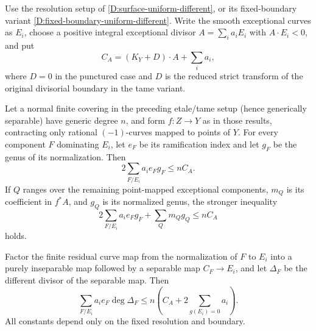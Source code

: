 \begin{corollary}
\label{D:surface-residual-genus-bound}
Use the resolution setup of
\ref{D:surface-uniform-different}, or its fixed-boundary variant
\ref{D:fixed-boundary-uniform-different}. Write the smooth exceptional
curves as $E_i$, choose a positive integral exceptional divisor
$A=\sum_i a_iE_i$ with $A\cdot E_i<0$, and put
\[
 C_A=(K_Y+D)\cdot A+\sum_i a_i,
\]
where $D=0$ in the punctured case and $D$ is the reduced strict
transform of the original divisorial boundary in the tame variant.

Let a normal finite covering in the preceding etale/tame setup
(hence generically separable) have generic degree $n$, and form
$f:Z\to Y$ as in those results, contracting only rational
$(-1)$-curves mapped to points of $Y$. For every component $F$
dominating $E_i$, let $e_F$ be its ramification index and let
$g_F$ be the genus of its normalization. Then
\[
 2\sum_{F/E_i}a_i e_Fg_F\leq n C_A.
 \tag{15}
\]
If $Q$ ranges over the remaining point-mapped exceptional components,
$m_Q$ is its coefficient in $f^*A$, and $g_Q$ is its normalized
genus, the stronger inequality
\[
 2\sum_{F/E_i}a_i e_Fg_F+\sum_Qm_Qg_Q\leq n C_A
 \tag{16}
\]
holds.

Factor the finite residual curve map from the normalization of $F$
to $E_i$ into a purely inseparable map followed by a separable map
$C_F\to E_i$, and let $\Delta_F$ be the different divisor of the
separable map. Then
\[
 \sum_{F/E_i}a_i e_F\deg\Delta_F
 \leq n\left(C_A+2\sum_{g(E_i)=0}a_i\right).
 \tag{17}
\]
All constants depend only on the fixed resolution and boundary.
\end{corollary}

